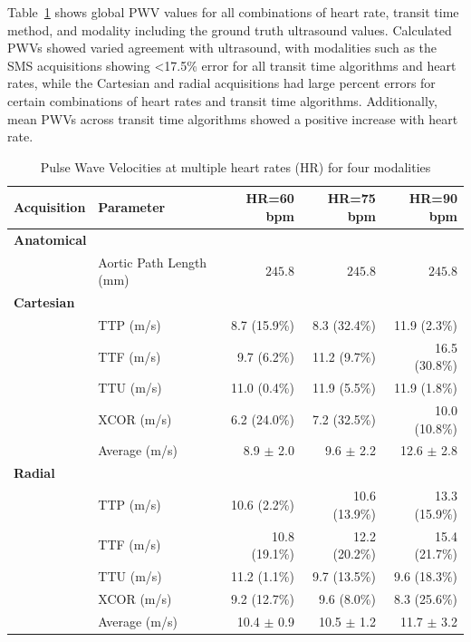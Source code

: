 Table~\ref{tab:phantom_PWVs} shows global PWV values for all combinations of heart rate, transit time method, and modality including the ground truth ultrasound values. Calculated PWVs showed varied agreement with ultrasound, with modalities such as the SMS acquisitions showing <17.5\% error for all transit time algorithms and heart rates, while the Cartesian and radial acquisitions had large percent errors for certain combinations of heart rates and transit time algorithms. Additionally, mean PWVs across transit time algorithms showed a positive increase with heart rate.

\begin{table}[ht]
    \centering
    \caption[Phantom Pulse Wave Velocities]{Pulse Wave Velocities at multiple heart rates (HR) for four modalities}\label{tab:phantom_PWVs}
    \small
    \begin{tabularx}{\textwidth}{llrrr}
    \toprule
    Acquisition & Parameter & HR=60 bpm & HR=75 bpm & HR=90 bpm \\
    
    \midrule
    \multicolumn{5}{l}{\textbf{Anatomical}} \\
    & Aortic Path Length (mm) & 
    $245.8$ & 
    $245.8$ & 
    $245.8$ \\

    \midrule
    \multicolumn{5}{l}{\textbf{Cartesian}} \\

    & TTP (m/s)  & 8.7 (15.9\%) & 8.3 (32.4\%) & 11.9 (\phantom{0}2.3\%) \\
    & TTF (m/s)  & 9.7 (\phantom{0}6.2\%) & 11.2 (\phantom{0}9.7\%) & 16.5 (30.8\%) \\
    & TTU (m/s)  & 11.0 (\phantom{0}0.4\%) & 11.9 (\phantom{0}5.5\%) & 11.9 (\phantom{0}1.8\%) \\
    & XCOR (m/s) & 6.2 (24.0\%) & 7.2 (32.5\%) & 10.0 (10.8\%) \\
    & Average (m/s) & 8.9\phantom{0} $\pm$ \phantom{0}2.0 & 9.6\phantom{0} $\pm$ \phantom{0}2.2 & 12.6\phantom{0} $\pm$ \phantom{0}2.8 \\

    \midrule
    \multicolumn{5}{l}{\textbf{Radial}} \\

    & TTP (m/s)  & 10.6 (\phantom{0}2.2\%) & 10.6 (13.9\%) & 13.3 (15.9\%) \\
    & TTF (m/s)  & 10.8 (19.1\%) & 12.2 (20.2\%) & 15.4 (21.7\%) \\
    & TTU (m/s)  & 11.2 (\phantom{0}1.1\%) & 9.7 (13.5\%) & 9.6 (18.3\%) \\
    & XCOR (m/s) & 9.2 (12.7\%) & 9.6 (\phantom{0}8.0\%) & 8.3 (25.6\%) \\
    & Average (m/s) & 10.4\phantom{0} $\pm$ \phantom{0}0.9 & 10.5\phantom{0} $\pm$ \phantom{0}1.2 & 11.7\phantom{0} $\pm$ \phantom{0}3.2 \\


\end{tabularx}
\end{table}
